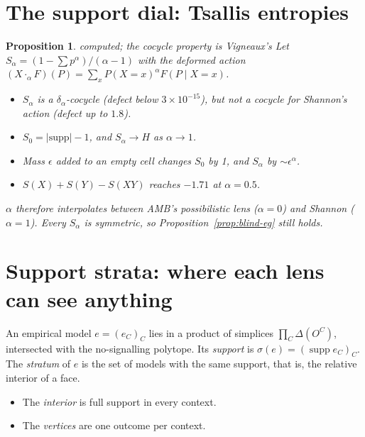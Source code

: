\documentclass[11pt]{article}
\newtheorem{proposition}[theorem]{Proposition}
\theoremstyle{definition}
\theoremstyle{remark}
\newcommand{\st}[1]{\textsf{\small\color{gray}#1}}
\begin{document}
\section{The support dial: Tsallis entropies}\label{sec:tsallis}
\begin{proposition}\label{res:auto16}\st{computed; the cocycle property is Vigneaux's}
Let $S_\alpha=(1-\sum p^\alpha)/(\alpha-1)$ with the deformed action $(X\cdot_\alpha F)(P)=\sum_xP(X{=}x)^\alpha F(P\mid X{=}x)$.
\begin{itemize}
  \item $S_\alpha$ is a $\delta_\alpha$-cocycle (defect below $3\times10^{-15}$), but not a cocycle for Shannon's action (defect up to $1.8$).
  \item $S_0=|\mathrm{supp}|-1$, and $S_\alpha\to H$ as $\alpha\to1$.
  \item Mass $\epsilon$ added to an empty cell changes $S_0$ by 1, and $S_\alpha$ by $\sim\epsilon^\alpha$.
  \item $S(X)+S(Y)-S(XY)$ reaches $-1.71$ at $\alpha=0.5$.
\end{itemize}
$\alpha$ therefore interpolates between AMB's possibilistic lens ($\alpha=0$) and Shannon ($\alpha=1$). Every $S_\alpha$ is symmetric, so Proposition~\ref{prop:blind-eg} still holds.
\end{proposition}

\section{Support strata: where each lens can see anything}\label{sec:strata}
An empirical model $e=(e_C)_C$ lies in a product of simplices $\prod_C\Delta(O^C)$, intersected with the no-signalling polytope. Its \emph{support} is $\sigma(e)=(\operatorname{supp}e_C)_C$. The \emph{stratum} of $e$ is the set of models with the same support, that is, the relative interior of a face.
\begin{itemize}
  \item The \emph{interior} is full support in every context.
  \item The \emph{vertices} are one outcome per context.
\end{itemize}
\end{document}
